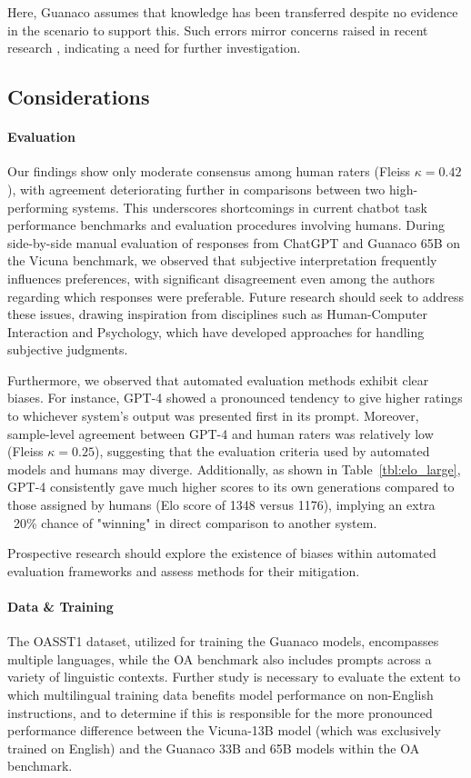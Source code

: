 Here, {Guanaco} assumes that knowledge has been transferred despite no evidence in the scenario to support this. Such errors mirror concerns raised in recent research \cite{sap2022neural}, indicating a need for further investigation.

\subsection{Considerations}
\label{ssec:considerations}

\paragraph{Evaluation}

Our findings show only moderate consensus among human raters (Fleiss $\kappa=0.42$), with agreement deteriorating further in comparisons between two high-performing systems. This underscores shortcomings in current chatbot task performance benchmarks and evaluation procedures involving humans. During side-by-side manual evaluation of responses from ChatGPT and {Guanaco} 65B on the Vicuna benchmark, we observed that subjective interpretation frequently influences preferences, with significant disagreement even among the authors regarding which responses were preferable. Future research should seek to address these issues, drawing inspiration from disciplines such as Human-Computer Interaction and Psychology, which have developed approaches for handling subjective judgments.

Furthermore, we observed that automated evaluation methods exhibit clear biases. For instance, GPT-4 showed a pronounced tendency to give higher ratings to whichever system’s output was presented first in its prompt. Moreover, sample-level agreement between GPT-4 and human raters was relatively low (Fleiss $\kappa=0.25$), suggesting that the evaluation criteria used by automated models and humans may diverge. Additionally, as shown in Table~\ref{tbl:elo_large}, GPT-4 consistently gave much higher scores to its own generations compared to those assigned by humans (Elo score of 1348 versus 1176), implying an extra ~20\% chance of "winning" in direct comparison to another system.

Prospective research should explore the existence of biases within automated evaluation frameworks and assess methods for their mitigation.

\paragraph{Data \& Training} The OASST1 dataset, utilized for training the {Guanaco} models, encompasses multiple languages, while the OA benchmark also includes prompts across a variety of linguistic contexts. Further study is necessary to evaluate the extent to which multilingual training data benefits model performance on non-English instructions, and to determine if this is responsible for the more pronounced performance difference between the Vicuna-13B model (which was exclusively trained on English) and the {Guanaco} 33B and 65B models within the OA benchmark.

